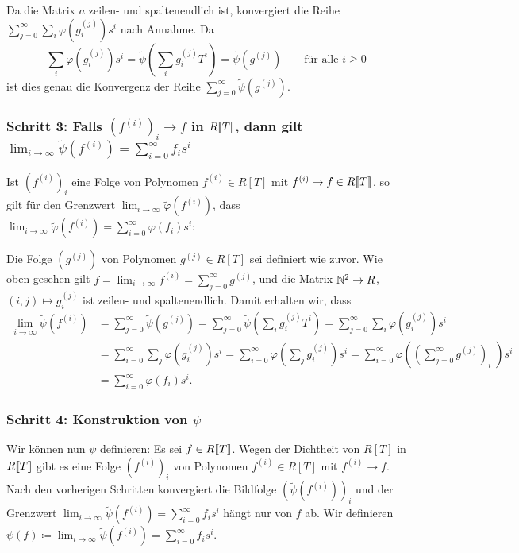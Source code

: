 \documentclass[a4paper, 10pt, numbers=noenddot]{scrartcl}
\begin{document}
Da die Matrix $a$ zeilen- und spaltenendlich ist, konvergiert die Reihe $\sum_{j=0}^\infty \sum_i \varphi( g^{(j)}_i ) s^i$ nach Annahme.
Da
\[
    \sum_i \varphi\left( g^{(j)}_i \right) s^i
  = \tilde{\psi}\left( \sum_i g^{(j)}_i T^i \right)
  = \tilde{\psi}\left( g^{(j)} \right)
  \qquad
  \text{für alle $i \geq 0$}
\]
ist dies genau die Konvergenz der Reihe $\sum_{j=0}^\infty \tilde{\psi}(g^{(j)})$.


\subsubsection*{Schritt 3: Falls $(f^{(i)})_i \to f$ in $R[\![T]\!]$, dann gilt $\lim_{i \to \infty} \tilde{\psi}(f^{(i)}) = \sum_{i=0}^\infty f_i s^i$}
Ist $(f^{(i)})_i$ eine Folge von Polynomen $f^{(i)} \in R[T]$ mit $f^{(i)} \to f \in R[\![T]\!]$, so gilt für den Grenzwert $\lim_{i \to \infty} \tilde{\varphi}(f^{(i)})$, dass $\lim_{i \to \infty} \tilde{\varphi}(f^{(i)}) = \sum_{i=0}^\infty \varphi(f_i) s^i$:

Die Folge $(g^{(j)})$ von Polynomen $g^{(j)} \in R[T]$ sei definiert wie zuvor.
Wie oben gesehen gilt $f = \lim_{i \to \infty} f^{(i)} = \sum_{j=0}^\infty g^{(j)}$, und die Matrix $\mathbb{N}^2 \to R$, $(i,j) \mapsto g^{(j)}_i$ ist zeilen- und spaltenendlich.
Damit erhalten wir, dass
\begin{align*}
    \lim_{i \to \infty} \tilde{\psi}\left( f^{(i)} \right)
  &= \sum_{j=0}^\infty \tilde{\psi}\left( g^{(j)} \right)
   = \sum_{j=0}^\infty \tilde{\psi}\left( \sum_i g^{(j)}_i T^i \right)
   = \sum_{j=0}^\infty \sum_i \varphi\left( g^{(j)}_i \right) s^i
  \\
  &= \sum_{i=0}^\infty \sum_j \varphi\left( g^{(j)}_i \right) s^i
   = \sum_{i=0}^\infty \varphi\left( \sum_j g^{(j)}_i \right) s^i
   = \sum_{i=0}^\infty \varphi\left( \left( \sum_{j=0}^\infty g^{(j)} \right)_{\!\!\!i}\; \right) s^i
  \\
  &= \sum_{i=0}^\infty \varphi(f_i) s^i.
\end{align*}


\subsubsection*{Schritt 4: Konstruktion von $\psi$}
Wir können nun $\psi$ definieren:
Es sei $f \in R[\![T]\!]$.
Wegen der Dichtheit von $R[T]$ in $R[\![T]\!]$ gibt es eine Folge $(f^{(i)})_i$ von Polynomen $f^{(i)} \in R[T]$ mit $f^{(i)} \to f$.
Nach den vorherigen Schritten konvergiert die Bildfolge $(\tilde{\psi}(f^{(i)}))_i$ und der Grenzwert $\lim_{i \to \infty} \tilde{\psi}(f^{(i)}) = \sum_{i=0}^\infty f_i s^i$ hängt nur von $f$ ab.
Wir definieren $\psi(f) \coloneqq \lim_{i \to \infty} \tilde{\psi}(f^{(i)}) = \sum_{i=0}^\infty f_i s^i$.
\end{document}
